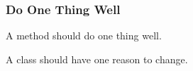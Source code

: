 \begin{frame}

\frametitle{Do One Thing Well}

\begin{center}

A method should do one thing well.

\end{center}

\begin{center}

A class should have one reason to change.

\end{center}

\end{frame}
